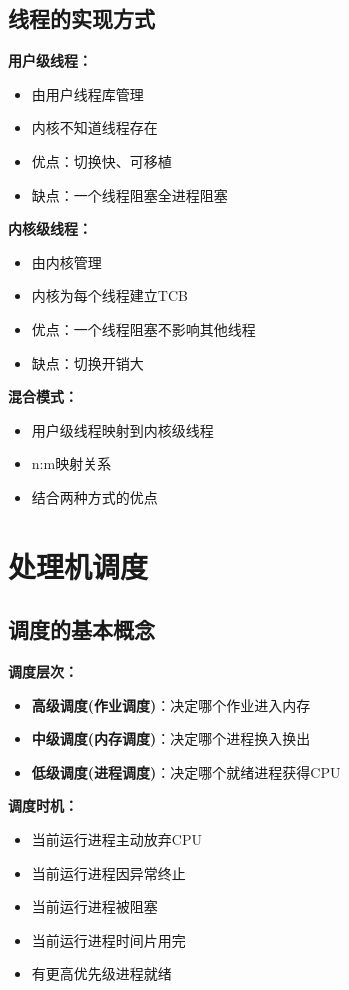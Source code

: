 \documentclass[lang=cn,newtx,10pt,scheme=chinese]{../../elegantbook}
\begin{document}
\subsection{线程的实现方式}

\textbf{用户级线程：}
\begin{itemize}
  \item 由用户线程库管理
  \item 内核不知道线程存在
  \item 优点：切换快、可移植
  \item 缺点：一个线程阻塞全进程阻塞
\end{itemize}

\textbf{内核级线程：}
\begin{itemize}
  \item 由内核管理
  \item 内核为每个线程建立TCB
  \item 优点：一个线程阻塞不影响其他线程
  \item 缺点：切换开销大
\end{itemize}

\textbf{混合模式：}
\begin{itemize}
  \item 用户级线程映射到内核级线程
  \item n:m映射关系
  \item 结合两种方式的优点
\end{itemize}

\section{处理机调度}

\subsection{调度的基本概念}

\textbf{调度层次：}
\begin{itemize}
  \item \textbf{高级调度(作业调度)}：决定哪个作业进入内存
  \item \textbf{中级调度(内存调度)}：决定哪个进程换入换出
  \item \textbf{低级调度(进程调度)}：决定哪个就绪进程获得CPU
\end{itemize}

\textbf{调度时机：}
\begin{itemize}
  \item 当前运行进程主动放弃CPU
  \item 当前运行进程因异常终止
  \item 当前运行进程被阻塞
  \item 当前运行进程时间片用完
  \item 有更高优先级进程就绪
\end{itemize}
\end{document}
